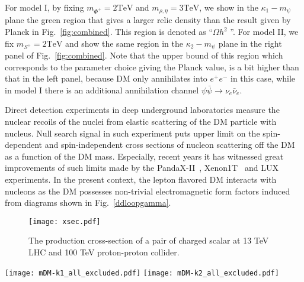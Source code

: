 \documentclass[aps,prd,letterpaper,showpacs,twocolumn,preprintnumbers,floatfix,superscriptaddress]{revtex4-1}
\begin{document}
For model I, by fixing $m_{\Phi^+} = 2\text{TeV}$ and $m_{\rho,\eta}=3\text{TeV}$, we show in the 
$\kappa_1 - m_{\psi}$ plane the green region that gives a larger relic density than the result given
by Planck in Fig.~\ref{fig:combined}. This region is denoted as ``$\Omega h^2$ ''.
%
For model II, we fix $m_{S^+} = 2\text{TeV}$ and show the same region in the $\kappa_2 - m_{\psi}$ plane 
in the right panel of Fig.~\ref{fig:combined}. 
%
Note that the upper bound of this region which corresponds to the parameter choice giving the Planck value, 
is a bit higher than that in the left panel, because DM only annihilates into $e^+e^-$ in this case, while in model I  there is an additional annihilation channel $\psi \bar \psi \to \nu_e \bar{\nu}_e$.

Direct detection experiments in deep underground laboratories measure the nuclear recoils of the nuclei 
from elastic scattering of the DM particle with nucleus. 
%
Null search signal in such experiment puts upper limit on the 
spin-dependent and spin-independent cross sections of nucleon scattering off the DM as a function of the DM 
mass. 
%
Especially, recent years it has witnessed great improvements of such limits made by the PandaX-II~\cite{Cui:2017nnn}, Xenon1T~\cite{Aprile:2017iyp} and LUX~\cite{Akerib:2016vxi} experiments.
%
In the present context, the lepton flavored DM interacts with nucleons as the DM possesses non-trivial electromagnetic form factors induced 
from diagrams shown in Fig.~\ref{ddloopgamma}.

\begin{figure}[t]
\centering
   \texttt{[image: xsec.pdf]}
 \caption{\label{fig:xsec}
   The production cross-section of a pair of charged scalar at 13 TeV LHC and 100 TeV proton-proton collider.
 }
 \end{figure} 

%
\begin{figure*}[t]
\centering
   \texttt{[image: mDM-k1\_all\_excluded.pdf]}
   \quad\quad
   \texttt{[image: mDM-k2\_all\_excluded.pdf]}
 \caption{\label{fig:combined}
   Combined constraints on the portal couplings $\kappa_1$ and $\kappa_2$ for model I(left) and model
   II(right) respectively. In each case, the charged scalar mass is taken to be $2\text{TeV}$ and further in model I 
the neutral scalars both have mass $3\text{TeV}$. The excluded regions by CMB, LUX and AMS-02 are shown 
as color-shaded regions. The green region gives a larger relic density than the Planck result and is therefore
excluded.  The brown region, labelled as ``DAMPE Favored'', denotes the possible DM explaination of the 
$\approx 1.5\text{TeV}$ excess with $10^{-26}\lesssim \langle \sigma v \rangle_{e^+ e^-}/  \text{cm}^3 \text{s}^{-1}\lesssim 10^{-24}$.
 }
 \end{figure*}
%
\end{document}
